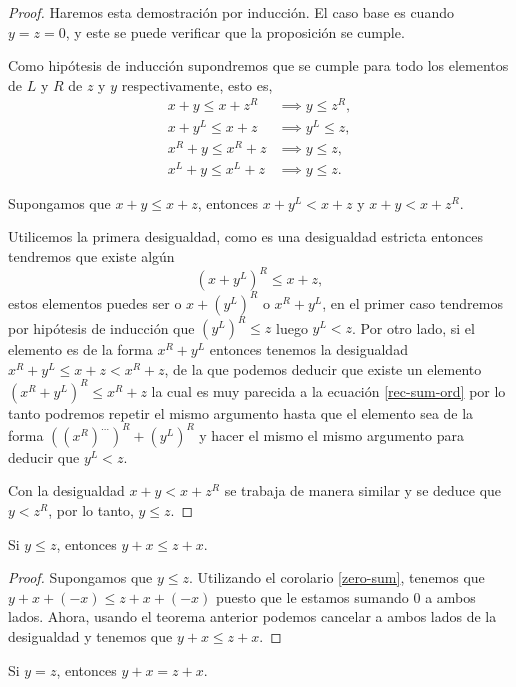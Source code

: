    \begin{proof}
        Haremos esta demostraci\'on por inducci\'on. El caso base es cuando $y=z=0$, y este se puede verificar que la proposici\'on se cumple.

        Como hip\'otesis de inducci\'on supondremos que se cumple para todo los elementos de $L$ y $R$ de $z$ y $y$ respectivamente, esto es,
        \begin{align*}
            x+y\le x+z^R & \implies y\le z^R,\\
            x+y^L\le x+z & \implies y^L\le z, \\
            x^R+y\le x^R+z & \implies y\le z,\\
            x^L+y\le x^L+z & \implies y\le z.
        \end{align*}

        Supongamos que $x+y\le x+z$, entonces $x+y^L < x+z$ y $x+y < x+z^R$. 
        
        Utilicemos la primera desigualdad, como es una desigualdad estricta entonces tendremos que existe alg\'un 
        \begin{equation}
            \label{rec-sum-ord}
            (x+y^L)^R \le x+z,
        \end{equation}
        estos elementos puedes ser o $x+(y^L)^R$ o $x^R+y^L$, en el primer caso tendremos por hip\'otesis de inducci\'on que $(y^L)^R \le z$ luego $y^L < z$. Por otro lado, si el elemento es de la forma $x^R+y^L$ entonces tenemos la desigualdad $x^R+y^L \le x+z < x^R+z$, de la que podemos deducir que existe un elemento $(x^R+y^L)^R \le x^R+z$ la cual es muy parecida a la ecuaci\'on \ref{rec-sum-ord} por lo tanto podremos repetir el mismo argumento hasta que el elemento sea de la forma $\left((x^R)^{\dots}\right)^R + (y^L)^R$ y hacer el mismo el mismo argumento para deducir que $y^L < z$.

        Con la desigualdad $x+y < x+z^R$ se trabaja de manera similar y se deduce que $y < z^R$, por lo tanto, $y\le z$.
    \end{proof}

    \begin{corollary}
        Si $y \le z$, entonces $y+x \le z+x$.
    \end{corollary}

    \begin{proof}
        Supongamos que $y\le z$. Utilizando el corolario \ref{zero-sum}, tenemos que $y+x+(-x)\le z+x+(-x)$ puesto que le estamos sumando $0$ a ambos lados. Ahora, usando el teorema anterior podemos cancelar a ambos lados de la desigualdad y tenemos que $y+x\le z+x$.
    \end{proof}

    \begin{corollary}
        Si $y=z$, entonces $y+x=z+x$.
    \end{corollary}